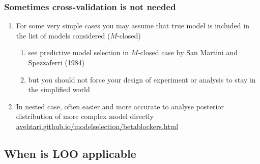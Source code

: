\documentclass[10pt]{beamer}
\begin{document}
\begin{frame}{}

\frametitle{ Sometimes cross-validation is not needed}

\begin{enumerate}
\item<+-> For some very simple cases you may assume that true model
  is included in the list of models considered ($M$-closed)
  \begin{enumerate}
  \item<+-> see predictive model selection in $M$-closed case by
    San Martini and Spezzaferri (1984)
  \item<+-> but you should not force your design of experiment or
    analysis to stay in the simplified world
  \end{enumerate}
\item<+-> In nested case, often easier and
  more accurate to analyse posterior distribution of more complex
  model directly \\
  {\small \url{avehtari.github.io/modelselection/betablockers.html}}
\end{enumerate}

\end{frame}


\subsection{When is LOO applicable}
\end{document}
